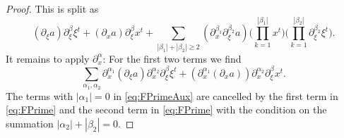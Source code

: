 \documentclass{amsart}
\theoremstyle{definition}
\begin{document}
\begin{proof}
This is split as
\begin{equation}
\label{eq:FPrimeExpAux}
    (\partial_{\xi} a) \partial_{\xi}^{\beta} \xi^t + (\partial_x a) \partial_{\xi}^{\beta} x^t + \sum_{|\beta_1|+|\beta_2| \geq 2} (\partial_{x}^{\beta_1} \partial_{\xi}^{\beta_2} a) \big( \prod_{k=1}^{|\beta_1|} x^t \big) \big( \prod_{k=1}^{|\beta_2|} \partial_{\xi}^{\beta_2} \xi^t \big).
\end{equation}
It remains to apply $\partial_x^{\alpha}$: For the first two terms we find
\begin{equation}
\label{eq:FPrimeAux}
    \sum_{\alpha_1,\alpha_2} \partial_x^{\alpha_1} (\partial_\xi a) \partial_x^{\alpha_2} \partial_{\xi}^{\beta} \xi^t + (\partial_x^{\alpha_1} (\partial_x a)) \partial_{x}^{\alpha_2} \partial_{\xi}^{\beta} x^t.
\end{equation}
The terms with $|\alpha_1| = 0$ in \eqref{eq:FPrimeAux} are cancelled by the first term in \eqref{eq:FPrime} and the second term in \eqref{eq:FPrime} with the condition on the summation $|\alpha_2| + |\beta_2| = 0$.


\end{proof}
\end{document}

